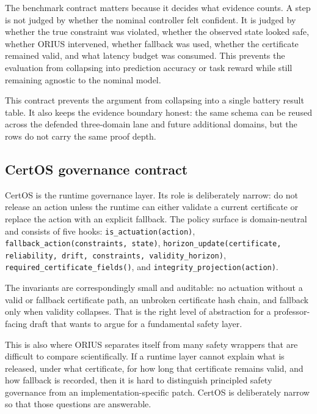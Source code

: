 The benchmark contract matters because it decides what evidence counts. A step is not
judged by whether the nominal controller felt confident. It is judged by whether the
true constraint was violated, whether the observed state looked safe, whether ORIUS
intervened, whether fallback was used, whether the certificate remained valid, and what
latency budget was consumed. This prevents the evaluation from collapsing into
prediction accuracy or task reward while still remaining agnostic to the nominal model.

This contract prevents the argument from collapsing into a single battery
result table. It also keeps the evidence boundary honest: the same schema
can be reused across the defended three-domain lane and future additional
domains, but the rows do not carry the same proof depth.

\subsection{CertOS governance contract}
CertOS is the runtime governance layer.  Its role is deliberately narrow:
do not release an action unless the runtime can either validate a current
certificate or replace the action with an explicit fallback.  The policy
surface is domain-neutral and consists of five hooks:
\texttt{is\_actuation(action)},
\texttt{fallback\_action(constraints, state)},
\texttt{horizon\_update(certificate, reliability, drift, constraints, validity\_horizon)},
\texttt{required\_certificate\_fields()}, and
\texttt{integrity\_projection(action)}.

The invariants are correspondingly small and auditable: no actuation
without a valid or fallback certificate path, an unbroken certificate hash
chain, and fallback only when validity collapses. That is the right level
of abstraction for a professor-facing draft that wants to argue for a
fundamental safety layer.

This is also where ORIUS separates itself from many safety wrappers that are difficult
to compare scientifically. If a runtime layer cannot explain what is released, under
what certificate, for how long that certificate remains valid, and how fallback is
recorded, then it is hard to distinguish principled safety governance from an
implementation-specific patch. CertOS is deliberately narrow so that those questions are
answerable.

